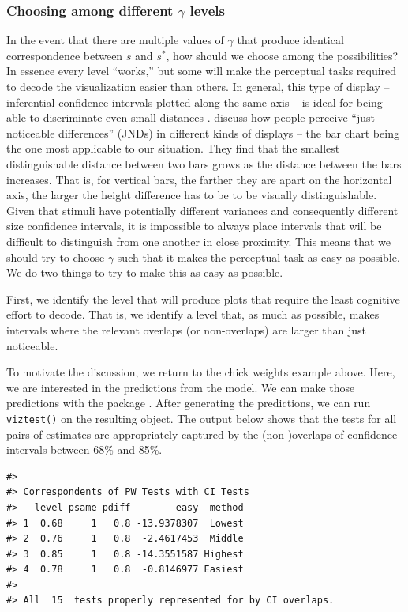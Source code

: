 \subsubsection{\texorpdfstring{Choosing among different \(\gamma\) levels}{Choosing among different \textbackslash gamma levels}}\label{choosing-among-different-gamma-levels}

In the event that there are multiple values of \(\gamma\) that produce identical correspondence between \(s\) and \(s^{*}\), how should we choose among the possibilities? In essence every level ``works,'' but some will make the perceptual tasks required to decode the visualization easier than others. In general, this type of display -- inferential confidence intervals plotted along the same axis -- is ideal for being able to discriminate even small distances \citep{cleveland84}. \citet{Lu2022} discuss how people perceive ``just noticeable differences'' (JNDs) in different kinds of displays -- the bar chart being the one most applicable to our situation. They find that the smallest distinguishable distance between two bars grows as the distance between the bars increases. That is, for vertical bars, the farther they are apart on the horizontal axis, the larger the height difference has to be to be visually distinguishable. Given that stimuli have potentially different variances and consequently different size confidence intervals, it is impossible to always place intervals that will be difficult to distinguish from one another in close proximity. This means that we should try to choose \(\gamma\) such that it makes the perceptual task as easy as possible. We do two things to try to make this as easy as possible.

First, we identify the level that will produce plots that require the least cognitive effort to decode. That is, we identify a level that, as much as possible, makes intervals where the relevant overlaps (or non-overlaps) are larger than just noticeable.

To motivate the discussion, we return to the chick weights example above. Here, we are interested in the predictions from the model. We can make those predictions with the  package \citep{marginaleffects}. After generating the predictions, we can run \texttt{viztest()} on the resulting object. The output below shows that the tests for all pairs of estimates are appropriately captured by the (non-)overlaps of confidence intervals between 68\% and 85\%.

\begin{verbatim}
#> 
#> Correspondents of PW Tests with CI Tests
#>   level psame pdiff        easy  method
#> 1  0.68     1   0.8 -13.9378307  Lowest
#> 2  0.76     1   0.8  -2.4617453  Middle
#> 3  0.85     1   0.8 -14.3551587 Highest
#> 4  0.78     1   0.8  -0.8146977 Easiest
#> 
#> All  15  tests properly represented for by CI overlaps.
\end{verbatim}

